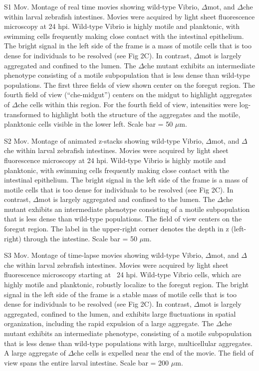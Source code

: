S1 Mov. Montage of real time movies showing wild-type Vibrio, $\Delta$mot, and $\Delta$che within larval zebrafish intestines. 
Movies were acquired by light sheet fluorescence microscopy at 24 hpi. Wild-type Vibrio is highly motile and planktonic, with swimming cells frequently making close contact with the intestinal epithelium. The bright signal in the left side of the frame is a mass of motile cells that is too dense for individuals to be resolved (see Fig 2C). In contrast, $\Delta$mot is largely aggregated and confined to the lumen. The $\Delta$che mutant exhibits an intermediate phenotype consisting of a motile subpopulation that is less dense than wild-type populations. The first three fields of view shown center on the foregut region. The fourth field of view (``che-midgut'') centers on the midgut to highlight aggregates of $\Delta$che cells within this region. For the fourth field of view, intensities were log-transformed to highlight both the structure of the aggregates and the motile, planktonic cells visible in the lower left. Scale bar = 50 $\mu$m. 

S2 Mov. Montage of animated z-stacks showing wild-type Vibrio, $\Delta$mot, and $\Delta$che within larval zebrafish intestines. 
Movies were acquired by light sheet fluorescence microscopy at 24 hpi. Wild-type Vibrio is highly motile and planktonic, with swimming cells frequently making close contact with the intestinal epithelium. The bright signal in the left side of the frame is a mass of motile cells that is too dense for individuals to be resolved (see Fig 2C). In contrast, $\Delta$mot is largely aggregated and confined to the lumen. The $\Delta$che mutant exhibits an intermediate phenotype consisting of a motile subpopulation that is less dense than wild-type populations. The field of view centers on the foregut region. The label in the upper-right corner denotes the depth in z (left-right) through the intestine. Scale bar = 50 $\mu$m. 

S3 Mov. Montage of time-lapse movies showing wild-type Vibrio, $\Delta$mot, and $\Delta$che within larval zebrafish intestines. 
Movies were acquired by light sheet fluorescence microscopy starting at ~24 hpi. Wild-type Vibrio cells, which are highly motile and planktonic, robustly localize to the foregut region. The bright signal in the left side of the frame is a stable mass of motile cells that is too dense for individuals to be resolved (see Fig 2C). In contrast, $\Delta$mot is largely aggregated, confined to the lumen, and exhibits large fluctuations in spatial organization, including the rapid expulsion of a large aggregate. The $\Delta$che mutant exhibits an intermediate phenotype, consisting of a motile subpopulation that is less dense than wild-type populations with large, multicellular aggregates. A large aggregate of $\Delta$che cells is expelled near the end of the movie. The field of view spans the entire larval intestine. Scale bar = 200 $\mu$m. 

